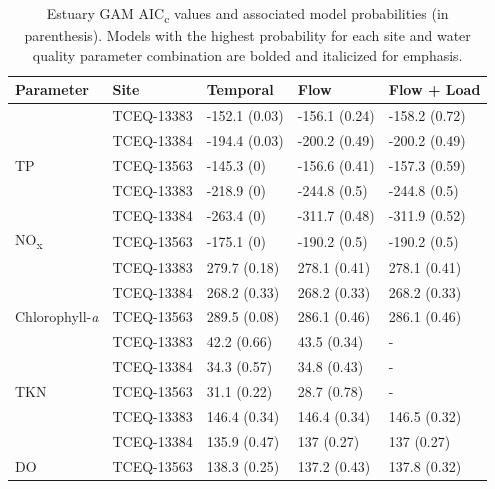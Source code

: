 \documentclass[sn-basic,referee,lineno,pdflatex]{sn-jnl}
\begin{document}
\begin{table}

\caption{\label{tab:table4}Estuary GAM AIC\textsubscript{c} values and associated model probabilities (in parenthesis). Models with the highest probability for each site and water quality parameter combination are bolded and italicized for emphasis.}
\centering
\begin{tabular}[t]{lllll}
\toprule
Parameter & Site & Temporal & Flow & Flow + Load\\
\midrule
 & TCEQ-13383 & -152.1 (0.03) & -156.1 (0.24) & -158.2 (0.72)\\

 & TCEQ-13384 & -194.4 (0.03) & -200.2 (0.49) & -200.2 (0.49)\\

\multirow{-3}{*}{\raggedright\arraybackslash TP} & TCEQ-13563 & -145.3 (0) & -156.6 (0.41) & -157.3 (0.59)\\
\cmidrule{1-5}
 & TCEQ-13383 & -218.9 (0) & -244.8 (0.5) & -244.8 (0.5)\\

 & TCEQ-13384 & -263.4 (0) & -311.7 (0.48) & -311.9 (0.52)\\

\multirow{-3}{*}{\raggedright\arraybackslash NO\textsubscript{x}} & TCEQ-13563 & -175.1 (0) & -190.2 (0.5) & -190.2 (0.5)\\
\cmidrule{1-5}
 & TCEQ-13383 & 279.7 (0.18) & 278.1 (0.41) & 278.1 (0.41)\\

 & TCEQ-13384 & 268.2 (0.33) & 268.2 (0.33) & 268.2 (0.33)\\

\multirow{-3}{*}{\raggedright\arraybackslash Chlorophyll-\textit{a}} & TCEQ-13563 & 289.5 (0.08) & 286.1 (0.46) & 286.1 (0.46)\\
\cmidrule{1-5}
 & TCEQ-13383 & 42.2 (0.66) & 43.5 (0.34) & -\\

 & TCEQ-13384 & 34.3 (0.57) & 34.8 (0.43) & -\\

\multirow{-3}{*}{\raggedright\arraybackslash TKN} & TCEQ-13563 & 31.1 (0.22) & 28.7 (0.78) & -\\
\cmidrule{1-5}
 & TCEQ-13383 & 146.4 (0.34) & 146.4 (0.34) & 146.5 (0.32)\\

 & TCEQ-13384 & 135.9 (0.47) & 137 (0.27) & 137 (0.27)\\

\multirow{-3}{*}{\raggedright\arraybackslash DO} & TCEQ-13563 & 138.3 (0.25) & 137.2 (0.43) & 137.8 (0.32)\\
\bottomrule
\end{tabular}
\end{table}
\end{document}
